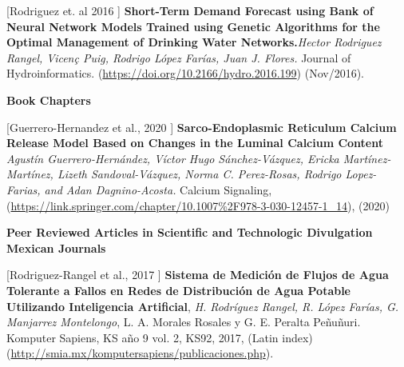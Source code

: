 \documentclass[7pt]{article}
\newenvironment{innerlist}[1][\enskip\textbullet]%
        {\begin{compactitem}[#1]}{\end{compactitem}}
\newcommand{\blankline}{\quad\pagebreak[2]}
\begin{document}
\begin{innerlist}
\item [[Rodriguez et. al 2016]] \textbf{Short-Term Demand Forecast using Bank of Neural Network Models Trained using Genetic Algorithms for the Optimal Management of Drinking Water Networks.}\textit{Hector Rodriguez Rangel, Vicen\c{c} Puig, Rodrigo López Farías, Juan J. Flores.}  {Journal of Hydroinformatics}. (\url{https://doi.org/10.2166/hydro.2016.199}) (Nov/2016).

\blankline

\textbf{Book Chapters}

\blankline

\item [[Guerrero-Hernandez et al., 2020]] \textbf{Sarco-Endoplasmic Reticulum Calcium Release Model Based on Changes in the Luminal Calcium Content} \textit{Agustín Guerrero-Hernández, Víctor Hugo Sánchez-Vázquez,
Ericka Martínez-Martínez, Lizeth Sandoval-Vázquez, Norma C. Perez-Rosas, Rodrigo Lopez-Farias, and Adan Dagnino-Acosta.} {Calcium Signaling},  (\url{https://link.springer.com/chapter/10.1007\%2F978-3-030-12457-1_14}), (2020)



\end{innerlist}
\blankline

\textbf{Peer Reviewed Articles in Scientific and Technologic Divulgation Mexican Journals }


\blankline



\begin{innerlist}


\item [[Rodriguez-Rangel et al., 2017]] \textbf{Sistema de Medición de Flujos de Agua Tolerante a Fallos en Redes de Distribución de Agua Potable Utilizando Inteligencia Artificial}, \textit{H. Rodríguez Rangel, R. López Farías, G. Manjarrez Montelongo}, L. A. Morales Rosales y G. E. Peralta Peñuñuri. Komputer Sapiens, KS año 9 vol. 2, KS92, 2017, (Latin index) (\url{http://smia.mx/komputersapiens/publicaciones.php}).

\end{innerlist}
\end{document}
